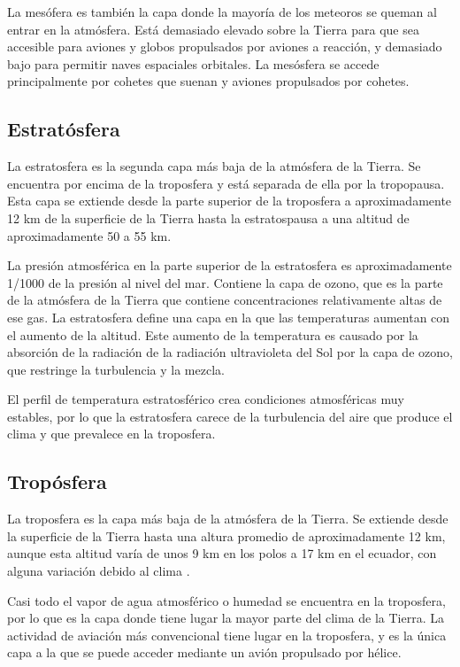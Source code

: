\documentclass{article} %
\begin{document}
La mesófera es también la capa donde la mayoría de los meteoros se queman al entrar en la atmósfera. Está demasiado elevado sobre la Tierra para que sea accesible para aviones y globos propulsados por aviones a reacción, y demasiado bajo para permitir naves espaciales orbitales. La mesósfera se accede principalmente por cohetes que suenan y aviones propulsados por cohetes.

\subsection{Estratósfera}

La estratosfera es la segunda capa más baja de la atmósfera de la Tierra. Se encuentra por encima de la troposfera y está separada de ella por la tropopausa. Esta capa se extiende desde la parte superior de la troposfera a aproximadamente 12 km de la superficie de la Tierra hasta la estratospausa a una altitud de aproximadamente 50 a 55 km.

La presión atmosférica en la parte superior de la estratosfera es aproximadamente 1/1000 de la presión al nivel del mar. Contiene la capa de ozono, que es la parte de la atmósfera de la Tierra que contiene concentraciones relativamente altas de ese gas. La estratosfera define una capa en la que las temperaturas aumentan con el aumento de la altitud. Este aumento de la temperatura es causado por la absorción de la radiación de la radiación ultravioleta del Sol por la capa de ozono, que restringe la turbulencia y la mezcla.

El perfil de temperatura estratosférico crea condiciones atmosféricas muy estables, por lo que la estratosfera carece de la turbulencia del aire que produce el clima y que prevalece en la troposfera.

\subsection{Tropósfera}

La troposfera es la capa más baja de la atmósfera de la Tierra. Se extiende desde la superficie de la Tierra hasta una altura promedio de aproximadamente 12 km, aunque esta altitud varía de unos 9 km en los polos a 17 km en el ecuador, con alguna variación debido al clima .

Casi todo el vapor de agua atmosférico o humedad se encuentra en la troposfera, por lo que es la capa donde tiene lugar la mayor parte del clima de la Tierra. La actividad de aviación más convencional tiene lugar en la troposfera, y es la única capa a la que se puede acceder mediante un avión propulsado por hélice.
\end{document}

